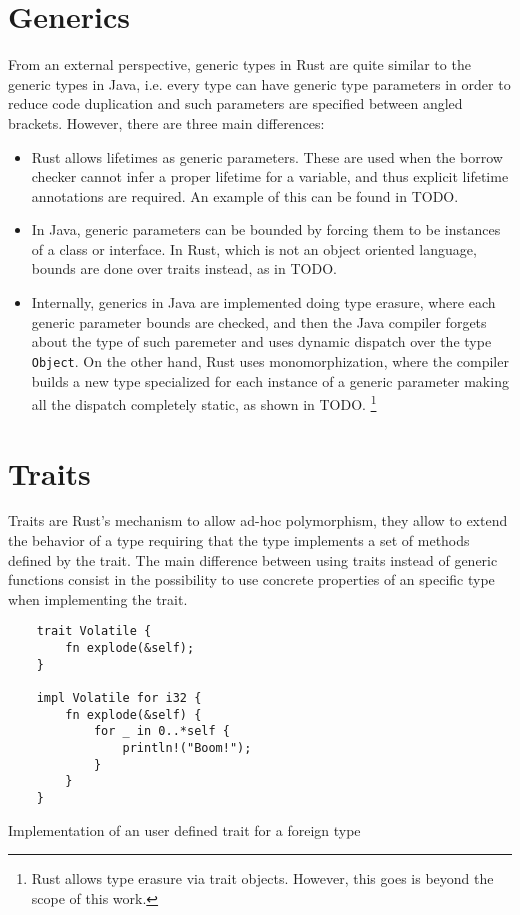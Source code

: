 \section{Generics}
From an external perspective, generic types in Rust are quite similar to the generic types in Java, i.e. every type can have generic type parameters in order to reduce code duplication and such parameters are specified between angled brackets. However, there are three main differences:
\begin{itemize}
    \item Rust allows lifetimes as generic parameters. These are used when the borrow checker cannot infer a proper lifetime for a variable, and thus explicit lifetime annotations are required. An example of this can be found in TODO.
    \item In Java, generic parameters can be bounded by forcing them to be instances of a class or interface. In Rust, which is not an object oriented language, bounds are done over traits instead, as in TODO.
    \item Internally, generics in Java are implemented doing type erasure, where each generic parameter bounds are checked, and then the Java compiler forgets about the type of such paremeter and uses dynamic dispatch over the type \texttt{Object}. On the other hand, Rust uses monomorphization, where the compiler builds a new type specialized for each instance of a generic parameter making all the dispatch completely static, as shown in TODO. \footnote{Rust allows type erasure via trait objects. However, this goes is beyond the scope of this work.}
\end{itemize}

\section{Traits}
Traits are Rust's mechanism to allow ad-hoc polymorphism, they allow to extend the behavior of a type requiring that the type implements a set of methods defined by the trait. The main difference between using traits instead of generic functions consist in the possibility to use concrete properties of an specific type when implementing the trait. \cite{traits}

\begin{listing}[ht]
	\begin{verbatim}
    trait Volatile {
        fn explode(&self);
    }

    impl Volatile for i32 {
        fn explode(&self) {
            for _ in 0..*self {
                println!("Boom!");
            }
        }
    }
    \end{verbatim}
  \caption{Implementation of an user defined trait for a foreign type}
  \label{lst:trait_foreign_impl}
\end{listing}

